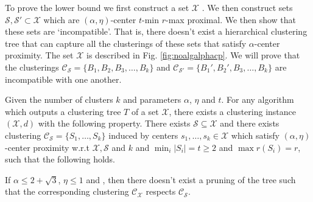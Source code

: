 \documentclass[anon,12pt]{colt2016} %
\newcommand{\mc}{\mathcal}
\begin{document}
To prove the lower bound we first construct a set $\mc X$ . We then construct sets $\mc S, \mc S' \subset \mc X$ which are $(\alpha, \eta)$-center $t$-min $r$-max proximal. We then show that these sets are `incompatible'. That is, there doesn't exist a  hierarchical clustering tree that can capture all the clusterings of these sets that satisfy $\alpha$-center proximity. The set $\mc X$ is described in Fig. \ref{fig:noalgalphacp}. We will prove that the clusterings $\mc C_{\mc S} = \{B_1, B_2, B_3, \ldots, B_k\}$ and $\mc C_{\mc S'} = \{B_1', B_2', B_3, \ldots, B_k\}$ are incompatible with one another.


\begin{theorem}
\label{thm:noalgalphacp}
Given the number of clusters $k$ and parameters $\alpha$, $\eta$ and $t$. For any algorithm which outputs a clustering tree $T$ of a set $\mc X$, there exists a clustering instance $(\mc X, d)$ with the following property. There exists $\mc S \subseteq \mc X$ and there exists clustering $\mc C_{\mc S} = \{S_1, \ldots, S_k\}$ induced by centers $s_1, \ldots, s_k \in \mc X$ which satisfy $(\alpha, \eta)$-center proximity w.r.t $\mc X, \mc S$ and $k$ and $ \min_i|S_i| = t \ge 2$ and $\max r(S_i) = r$, such that the following holds. 

If $\alpha \le 2 + \sqrt 3$, $\eta \le 1$ and , then there doesn't exist a pruning of the tree such that the corresponding clustering $\mc C_{\mc X}$ respects $\mc C_{\mc S}$.
\end{theorem}
\end{document}
